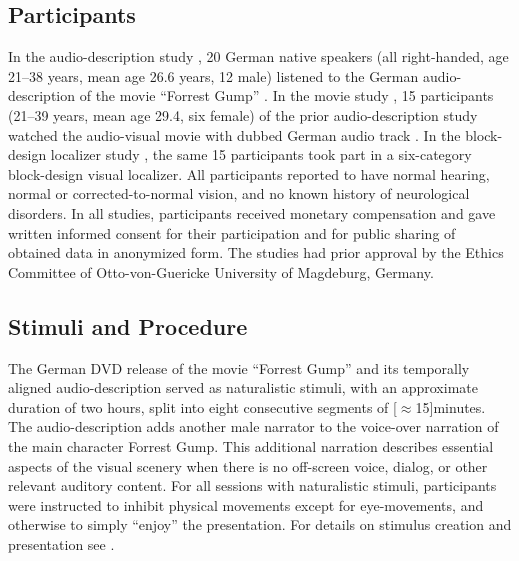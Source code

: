 \documentclass[english]{article}
\begin{document}
\subsection{Participants}
In the audio-description study \citep{hanke2014audiomovie}, 20 German native speakers (all
right-handed, age 21–38 years, mean age 26.6 years, 12 male) listened to the
German audio-description \citep{ForrestGumpGermanAD} of the movie ``Forrest
Gump'' \citep{ForrestGumpMovie}.
In the movie study \citep{hanke2016simultaneous}, 15 participants (21–39 years,
mean age 29.4, six female) of the prior audio-description study watched the audio-visual movie
with dubbed German audio track \citep{ForrestGumpDVD}.
In the block-design localizer study \citep{sengupta2016extension}, the same 15 participants took
part in a six-category block-design visual localizer.
All participants reported to have normal hearing, normal or corrected-to-normal
vision, and no known history of neurological disorders.
In all studies, participants received monetary compensation and gave written
informed consent for their participation and for public sharing of obtained data
in anonymized form. The studies had prior approval by the Ethics Committee of
Otto-von-Guericke University of Magdeburg, Germany.


\subsection{Stimuli and Procedure}

The German DVD release \citep{ForrestGumpDVD} of the movie ``Forrest Gump''
\citep{ForrestGumpMovie} and its temporally aligned audio-description
\citep{ForrestGumpGermanAD} served as naturalistic stimuli, with an approximate
duration of two hours, split into eight consecutive segments of
\unit[$\approx$15]{minutes}.
The audio-description adds another male narrator to the voice-over narration of
the main character Forrest Gump. This additional narration describes essential
aspects of the visual scenery when there is no off-screen voice, dialog, or
other relevant auditory content.
For all sessions with naturalistic stimuli, participants were instructed to
inhibit physical movements except for eye-movements, and otherwise to simply
``enjoy'' the presentation.
%
For details on stimulus creation and presentation see
\cite{hanke2014audiomovie,hanke2016simultaneous}.
\end{document}
